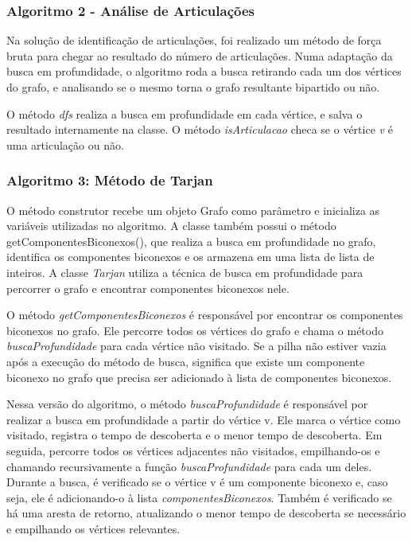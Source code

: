  
 \subsubsection{\esp Algoritmo 2 - Análise de Articulações}
 Na solução de identificação de articulações, foi realizado um método de força bruta para chegar ao resultado do número de articulações. Numa adaptação da busca em profundidade, o algoritmo roda a busca retirando cada um dos vértices do grafo, e analisando se o mesmo torna o grafo resultante bipartido ou não.

 O método \textit{dfs} realiza a busca em profundidade em cada vértice, e salva o resultado internamente na classe.
 O método \textit{isArticulacao} checa se o vértice \textit{v} é uma articulação ou não.

\subsubsection{\esp Algoritmo 3: Método de Tarjan}

 O método construtor recebe um objeto Grafo como parâmetro e inicializa as variáveis utilizadas no algoritmo. A classe também possui o método getComponentesBiconexos(), que realiza a busca em profundidade no grafo, identifica os componentes biconexos e os armazena em uma lista de lista de inteiros.
A classe \textit{Tarjan} utiliza a técnica de busca em profundidade para percorrer o grafo e encontrar componentes biconexos nele.

O método \textit{getComponentesBiconexos} é responsável por encontrar os componentes biconexos no grafo. Ele percorre todos os vértices do grafo e chama o método \textit{buscaProfundidade} para cada vértice não visitado. Se a pilha não estiver vazia após a execução do método de busca, significa que existe um componente biconexo no grafo que precisa ser adicionado à lista de componentes biconexos.



Nessa versão do algoritmo, o método \textit{buscaProfundidade} é responsável por realizar a busca em profundidade a partir do vértice v. Ele marca o vértice como visitado, registra o tempo de descoberta e o menor tempo de descoberta. Em seguida, percorre todos os vértices adjacentes não visitados, empilhando-os e chamando recursivamente a função \textit{buscaProfundidade} para cada um deles. Durante a busca, é verificado se o vértice v é um componente biconexo e, caso seja, ele é adicionando-o à lista \textit{componentesBiconexos}. Também é verificado se há uma aresta de retorno, atualizando o menor tempo de descoberta se necessário e empilhando os vértices relevantes.

